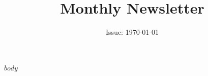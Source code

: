 \documentclass{article}
\begin{document}
    \title{Monthly Newsletter}
    \date{Issue: \today}
    \maketitle
    $body$
\end{document}

